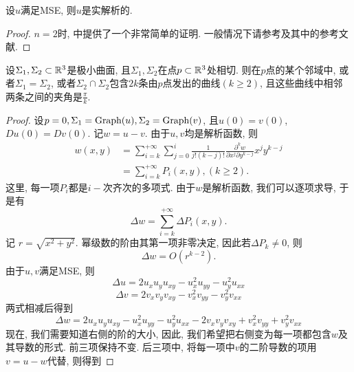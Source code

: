 \begin{theorem}
    设$u$满足MSE, 则$u$是实解析的.
\end{theorem}
\begin{proof}
    $n=2$时, \cite[p.125]{Nit1}中提供了一个非常简单的证明. 一般情况下请参考\cite{Giu84}及其中的参考文献.
\end{proof}
\begin{theorem}
    设$\Sigma_1,\Sigma_2 \subset \mathbb{R}^3$是极小曲面, 且$\Sigma_1,\Sigma_2$在点$p\subset \mathbb{R}^3$处相切. 则在$p$点的某个邻域中, 或者$\Sigma_1=\Sigma_2$, 或者$\Sigma_2 \cap \Sigma_2$包含$2k$条由$p$点发出的曲线$(k\ge 2)$, 且这些曲线中相邻两条之间的夹角是$\frac{\pi}{k}$.
\end{theorem}
\begin{proof}
    设$p=0, \Sigma_1=\text{Graph}(u), \Sigma_2=\text{Graph}(v)$, 且$u(0)=v(0)$, $Du(0)=Dv(0)$. 记$w=u-v$. 由于$u,v$均是解析函数, 则
    \begin{equation}
        \begin{split}
            w(x,y)&=\sum_{i=k}^{+\infty} \sum_{j=0}^{i} \frac{1}{j!(k-j)!}\frac{\partial^k w}{\partial x^j \partial y^{k-j}}x^jy^{k-j} \\
            &=\sum_{i=k}^{+\infty} P_i(x,y), (k\ge 2).
        \end{split}
    \end{equation}
    这里, 每一项$P_i$都是$i-$次齐次的多项式.  由于$w$是解析函数, 我们可以逐项求导, 于是有
    \begin{equation}
        \Delta w= \sum_{i=k}^{+\infty} \Delta P_i(x,y).
    \end{equation}
    记 $r=\sqrt{x^2+y^2}$. 幂级数的阶由其第一项非零决定, 因此若$\Delta P_k \ne 0$, 则
    \begin{equation} \label{equiangular1}
        \Delta w=O(r^{k-2}).
    \end{equation}
    由于$u,v$满足MSE, 则
    \begin{equation}
        \Delta u= 2u_xu_yu_{xy}-u_x^2u_{yy}-u_y^2u_{xx} 
    \end{equation}
    \begin{equation}
        \Delta v= 2v_xv_yv_{xy}-v_x^2v_{yy}-v_y^2v_{xx} 
    \end{equation}
    两式相减后得到
    \begin{equation}
        \Delta w= 2u_xu_yu_{xy}-u_x^2u_{yy}-u_y^2u_{xx} -2v_xv_yv_{xy}+v_x^2v_{yy}+v_y^2v_{xx} 
    \end{equation}
    现在, 我们需要知道右侧的阶的大小, 因此, 我们希望把右侧变为每一项都包含$w$及其导数的形式. 前三项保持不变. 后三项中, 将每一项中$v$的二阶导数的项用 $v=u-w$代替, 则得到

\end{proof}
